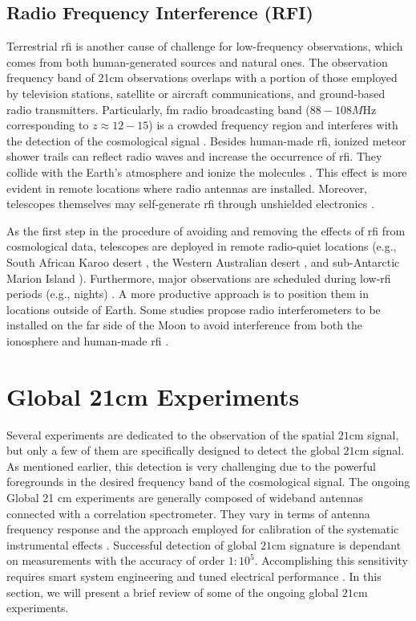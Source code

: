 \documentclass[12pt, TexShade, letterpaper]{report}
\begin{document}
\subsection{Radio Frequency Interference (RFI)}
Terrestrial \gls{rfi} is another cause of challenge for low-frequency observations, which comes from both human-generated sources and natural ones. The observation frequency band of 21cm observations overlaps with a portion of those employed by television stations, satellite or aircraft communications, and ground-based radio transmitters. Particularly, \gls{fm} radio broadcasting band ($88-108M\mathrm{Hz}$ corresponding to $z \approx 12-15$) is a crowded frequency region and interferes with the detection of the cosmological signal \cite{sci-hi_1}. 
Besides human-made \gls{rfi}, ionized meteor shower trails can reflect radio waves and increase the occurrence of \gls{rfi}. They collide with the Earth's atmosphere and ionize the molecules \cite{prizm_thesis}. This effect is more evident in remote locations where radio antennas are installed. Moreover, telescopes themselves may self-generate \gls{rfi} through unshielded electronics \cite{thesis_pamela}. \par
As the first step in the procedure of avoiding and removing the effects of \gls{rfi} from cosmological data, telescopes are deployed in remote radio-quiet locations (e.g., South African Karoo desert \cite{reach_design}, the Western Australian desert \cite{edges}, and sub-Antarctic Marion Island \cite{prizm_2017, prizm_thesis, rfi_1}). Furthermore, major observations are scheduled during low-\gls{rfi} periods (e.g., nights) \cite{leda_design}. A more productive approach is to position them in locations outside of Earth. Some studies propose radio interferometers to be installed on the far side of the Moon \cite{lunar_far_side, global_moon_far_side} to avoid interference from both the ionosphere and human-made \gls{rfi} \cite{thesis_pamela}. \par
\section{Global 21cm Experiments}
Several experiments are dedicated to the observation of the spatial $\mathrm{21cm}$ signal, but only a few of them are specifically designed to detect the global $\mathrm{21cm}$ signal. As mentioned earlier, this detection is very challenging due to the powerful foregrounds in the desired frequency band of the cosmological signal. The ongoing Global 21 cm experiments are generally composed of wideband antennas connected with a correlation spectrometer. They vary in terms of antenna frequency response and the approach employed for calibration of the systematic instrumental effects \cite{hyperion_1}. Successful detection of global $\mathrm{21cm}$ signature is dependant on measurements with the accuracy of order $1:10^5$. Accomplishing this sensitivity requires smart system engineering and tuned electrical performance \cite{hyperion_2}. In this section, we will present a brief review of some of the ongoing global $\mathrm{21cm}$ experiments.\par
\end{document}
